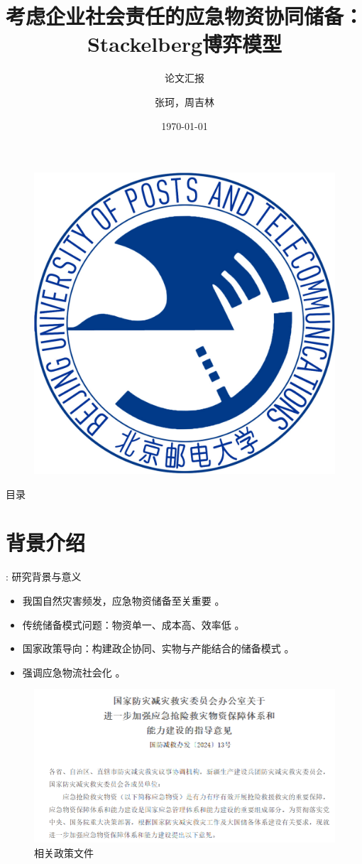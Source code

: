 \documentclass[9pt]{beamer}
\author{张珂，周吉林}
\title{考虑企业社会责任的应急物资协同储备：Stackelberg博弈模型}
\subtitle{论文汇报}
\institute{北京邮电大学 智能工程与自动化学院}
\date{\today}
\begin{document}
\kaishu
\begin{frame}
    \titlepage
    \begin{figure}[htpb]
        \begin{center}
            \vspace*{-0.5cm}
            \includegraphics[width=0.18\linewidth]{basic_pictures/bupt.jpg}
        \end{center}
    \end{figure}
\end{frame}

\begin{frame}{目录}
\tableofcontents[sectionstyle=show,subsectionstyle=show/shaded/hide,subsubsectionstyle=show/shaded/hide]
\end{frame}

\section{背景介绍}
\begin{frame}{\insertsectionhead: 研究背景与意义}
    \begin{itemize}
        \item 我国自然灾害频发，应急物资储备至关重要 \cite{MEM2024disaster, chen2009modern}。
        \item 传统储备模式问题：物资单一、成本高、效率低 \cite{chen2014突发事件灾前应急物资政企联合储备模式, wang2023防汛物资}。
        \item 国家政策导向：构建政企协同、实物与产能结合的储备模式 \cite{ndrc2022, sfdrrmc2024}。
        \item 强调应急物流社会化 \cite{lu2009应急物资储备的社会化研究}。
    \end{itemize}
    \begin{figure}
        \centering
        \includegraphics[width=0.8\linewidth]{basic_pictures/政府文件.png}
        \caption{相关政策文件}
        \label{fig:beamer_policy_guidance}
    \end{figure}
\end{frame}
\end{document}
